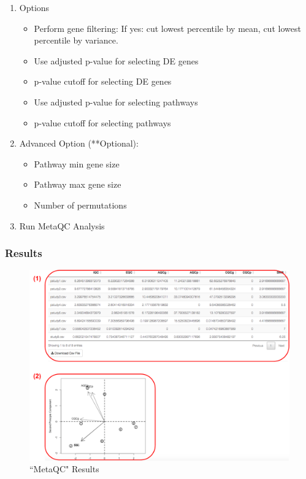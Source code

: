 \begin{enumerate}
  \item Options
  \begin{itemize}
     \item Perform gene filtering: If yes: cut lowest percentile by mean, cut lowest percentile by variance. 
     \item Use adjusted p-value for selecting DE genes
     \item p-value cutoff for selecting DE genes
     \item Use adjusted p-value for selecting pathways
     \item p-value cutoff for selecting pathways
    \end{itemize}
   \item Advanced Option (**Optional): 
        \begin{itemize}
      \item Pathway min gene size
      \item Pathway max gene size
      \item Number of permutations
    \end{itemize} 
  \item Run MetaQC Analysis
\end{enumerate}
   

\subsubsection{Results}


\begin{figure}[H]
\begin{center}
\includegraphics[scale=0.7]{./figure/metaQC/metaQCresult.pdf}
\caption{``MetaQC" Results}
\label{fig:MetaQCresult}
\end{center}
\end{figure}


